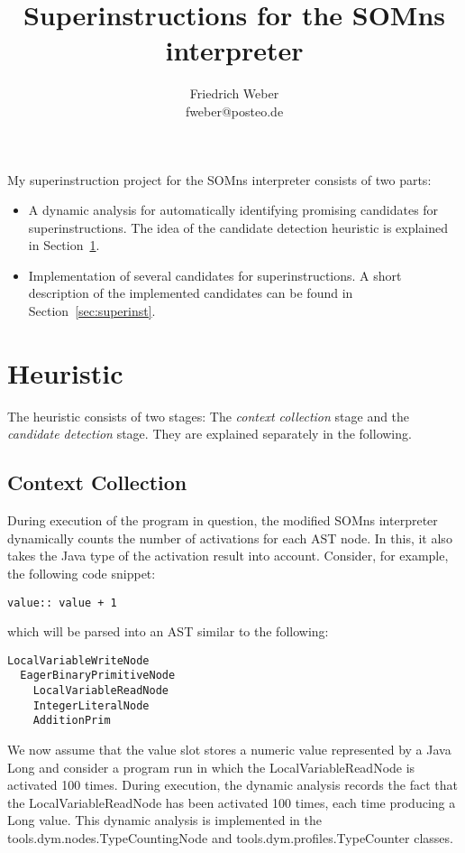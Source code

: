 \documentclass[10pt,a4paper]{article}
\author{Friedrich Weber\\
\small fweber@posteo.de}
\title{Superinstructions for the SOMns interpreter}
\begin{document}
	
\maketitle

My superinstruction project for the SOMns interpreter consists of two parts:
\begin{itemize}
	\item A dynamic analysis for automatically identifying promising candidates for superinstructions. The idea of the candidate detection heuristic is explained in Section~\ref{sec:heuristic}.
	\item Implementation of several candidates for superinstructions. A short description of the implemented candidates can be found in Section~\ref{sec:superinst}.
\end{itemize}

\section{Heuristic}\label{sec:heuristic}

The heuristic consists of two stages: The \emph{context collection} stage and the \emph{candidate detection} stage. They are explained separately in the following.

\subsection{Context Collection}

During execution of the program in question, the modified SOMns interpreter dynamically counts the number of activations for each AST node. In this, it also takes the Java type of the activation result into account. Consider, for example, the following code snippet:
\begin{verbatim}
value:: value + 1
\end{verbatim}
which will be parsed into an AST similar to the following:
\begin{verbatim}
LocalVariableWriteNode
  EagerBinaryPrimitiveNode
    LocalVariableReadNode
    IntegerLiteralNode
    AdditionPrim
\end{verbatim}
We now assume that the \textsf{value} slot stores a numeric value represented by a Java \textsf{Long} and consider a program run in which the \textsf{LocalVariableReadNode} is activated 100 times. During execution, the dynamic analysis records the fact that the \textsf{LocalVariableReadNode} has been activated 100 times, each time producing a \textsf{Long} value. This dynamic analysis is implemented in the \textsf{tools.dym.nodes.TypeCountingNode} and \textsf{tools.dym.profiles.TypeCounter} classes.
\end{document}
